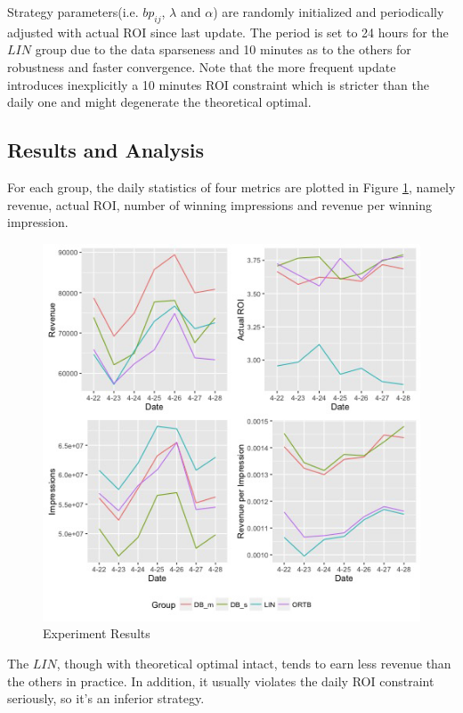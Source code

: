 \documentclass{article}
\newcommand{\sbp}{bp_{ij}}
\begin{document}
Strategy parameters(i.e. $\sbp$, $\lambda$ and $\alpha$) are randomly initialized and
    periodically adjusted with actual ROI since last update.
The period is set to 24 hours for the $LIN$ group due to the data sparseness
    and 10 minutes as to the others for robustness and faster convergence.
Note that the more frequent update introduces inexplicitly a 10 minutes ROI constraint
    which is stricter than the daily one and might degenerate the theoretical optimal.

\subsection{Results and Analysis}

For each group, the daily statistics of four metrics are plotted in Figure \ref{Result},
    namely revenue, actual ROI, number of winning impressions and revenue per winning impression.

\begin{figure}[!h]
\centering
\includegraphics[width=1.0\linewidth]{./Result.jpg}
\caption{Experiment Results\label{Result}}
\end{figure}

The $LIN$, though with theoretical optimal intact, tends to earn less revenue than the others in practice.
In addition, it usually violates the daily ROI constraint seriously, so it's an inferior strategy.
\end{document}
